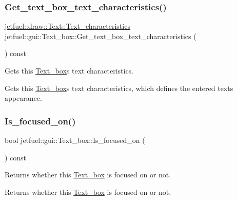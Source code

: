 \subsubsection{\texorpdfstring{Get\+\_\+text\+\_\+box\+\_\+text\+\_\+characteristics()}{Get\_text\_box\_text\_characteristics()}}
{\footnotesize\ttfamily \hyperlink{structjetfuel_1_1draw_1_1Text_1_1Text__characteristics}{jetfuel\+::draw\+::\+Text\+::\+Text\+\_\+characteristics} jetfuel\+::gui\+::\+Text\+\_\+box\+::\+Get\+\_\+text\+\_\+box\+\_\+text\+\_\+characteristics (\begin{DoxyParamCaption}{ }\end{DoxyParamCaption}) const\hspace{0.3cm}{\ttfamily [inline]}}



Gets this \hyperlink{classjetfuel_1_1gui_1_1Text__box}{Text\+\_\+box}\textquotesingle{}s text characteristics. 

Gets this \hyperlink{classjetfuel_1_1gui_1_1Text__box}{Text\+\_\+box}\textquotesingle{}s text characteristics, which defines the entered text\textquotesingle{}s appearance. \mbox{\label{classjetfuel_1_1gui_1_1Text__box_ab98bbc61a1355002c5f92e52ecd986ea}} 
\subsubsection{\texorpdfstring{Is\+\_\+focused\+\_\+on()}{Is\_focused\_on()}}
{\footnotesize\ttfamily bool jetfuel\+::gui\+::\+Text\+\_\+box\+::\+Is\+\_\+focused\+\_\+on (\begin{DoxyParamCaption}{ }\end{DoxyParamCaption}) const\hspace{0.3cm}{\ttfamily [inline]}}



Returns whether this \hyperlink{classjetfuel_1_1gui_1_1Text__box}{Text\+\_\+box} is focused on or not. 

Returns whether this \hyperlink{classjetfuel_1_1gui_1_1Text__box}{Text\+\_\+box} is focused on or not. \mbox{\label{classjetfuel_1_1gui_1_1Text__box_a4671dbf122880e20bdc8953c4ea8a045}} 
